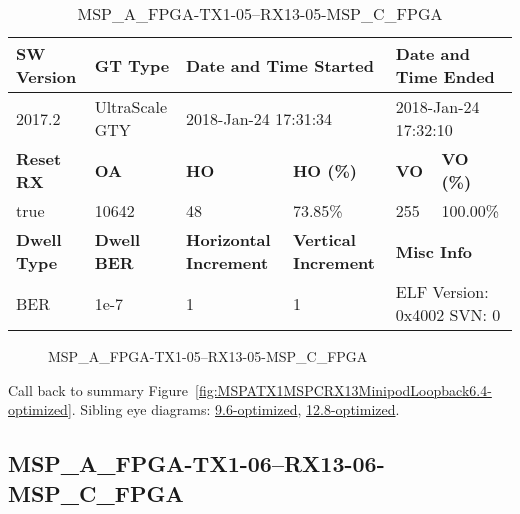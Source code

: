 \begin{table}[h]
\centering
\caption{MSP\_A\_FPGA-TX1-05--RX13-05-MSP\_C\_FPGA}
\label{tab:MSPAFPGATX105RX1305MSPCFPGA6.4-optimized}
\begin{tabular}{@{}|l|l|l|l|l|l|@{}}
\toprule
\textbf{SW Version}                & \textbf{GT Type}   & \multicolumn{2}{l|}{\textbf{Date and Time Started}}            & \multicolumn{2}{l|}{\textbf{Date and Time Ended}}        \\ \midrule
2017.2                       & UltraScale GTY          & \multicolumn{2}{l|}{2018-Jan-24 17:31:34}                   & \multicolumn{2}{l|}{2018-Jan-24 17:32:10}               \\ \midrule
\textbf{Reset RX}                  & \textbf{OA} & \textbf{HO}   & \textbf{HO (\%)} & \textbf{VO} & \textbf{VO (\%)} \\ \midrule
true & 10642        & 48          & 73.85\%        & 255        & 100.00\%       \\ \midrule
\textbf{Dwell Type}                & \textbf{Dwell BER} & \textbf{Horizontal Increment} & \textbf{Vertical Increment}    & \multicolumn{2}{l|}{\textbf{Misc Info}}                  \\ \midrule
BER                            & 1e-7        & 1        & 1           & \multicolumn{2}{l|}{ELF Version: 0x4002 SVN: 0}                         \\ \bottomrule
\end{tabular}
\end{table}

\begin{figure}[h]
\caption{MSP\_A\_FPGA-TX1-05--RX13-05-MSP\_C\_FPGA} \label{fig:MSPAFPGATX105RX1305MSPCFPGA6.4-optimized}
\end{figure}

Call back to summary Figure~\ref{fig:MSPATX1MSPCRX13MinipodLoopback6.4-optimized}.
Sibling eye diagrams: \hyperref[sec:MSPAFPGATX105RX1305MSPCFPGA9.6-optimized]{9.6-optimized}, \hyperref[sec:MSPAFPGATX105RX1305MSPCFPGA12.8-optimized]{12.8-optimized}.

\clearpage
\newpage


\subsection{MSP\_A\_FPGA-TX1-06--RX13-06-MSP\_C\_FPGA}\label{sec:MSPAFPGATX106RX1306MSPCFPGA6.4-optimized}

